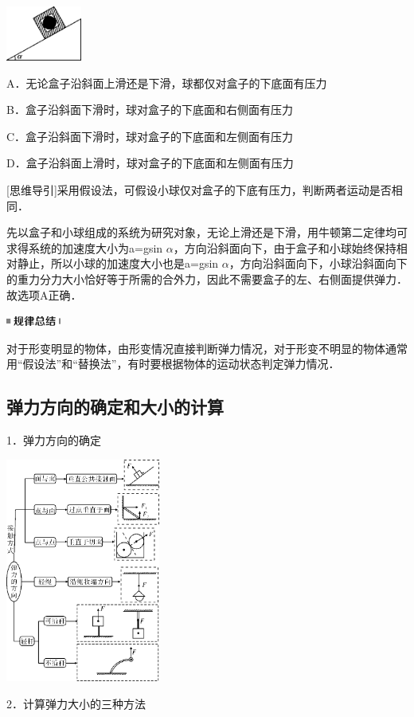 \begin{center}\includegraphics[width=0.97917in,height=0.70833in]{media/image43.png}\end{center}

A．无论盒子沿斜面上滑还是下滑，球都仅对盒子的下底面有压力

B．盒子沿斜面下滑时，球对盒子的下底面和右侧面有压力

C．盒子沿斜面下滑时，球对盒子的下底面和左侧面有压力

D．盒子沿斜面上滑时，球对盒子的下底面和左侧面有压力

{[}思维导引{]}采用假设法，可假设小球仅对盒子的下底有压力，判断两者运动是否相同．
\begin{solution}
	先以盒子和小球组成的系统为研究对象，无论上滑还是下滑，用牛顿第二定律均可求得系统的加速度大小为a=gsin
$\alpha$，方向沿斜面向下，由于盒子和小球始终保持相对静止，所以小球的加速度大小也是a=gsin
$\alpha$，方向沿斜面向下，小球沿斜面向下的重力分力大小恰好等于所需的合外力，因此不需要盒子的左、右侧面提供弹力．故选项A正确．
\end{solution}

\begin{center}\includegraphics[width=0.70833in,height=0.125in]{media/image44.png}\end{center}
对于形变明显的物体，由形变情况直接判断弹力情况，对于形变不明显的物体通常用``假设法''和``替换法''，有时要根据物体的运动状态判定弹力情况．

\subsection{弹力方向的确定和大小的计算}

1．弹力方向的确定

\begin{center}\includegraphics[width=2in]{media/image45.png}\end{center}
2．计算弹力大小的三种方法

